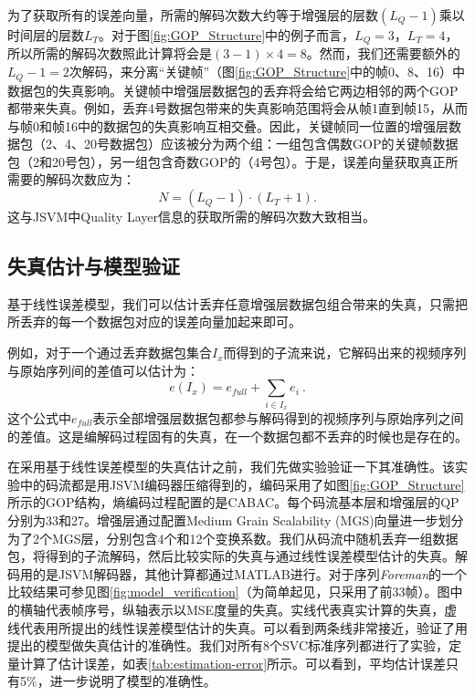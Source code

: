 为了获取所有的误差向量，所需的解码次数大约等于增强层的层数$(L_Q - 1)$乘以时间层的层数$L_T$。对于图\ref{fig:GOP_Structure}中的例子而言，$L_Q = 3$，$L_T = 4$，所以所需的解码次数照此计算将会是$(3 - 1) \times 4 = 8$。然而，我们还需要额外的$L_Q - 1 = 2$次解码，来分离“关键帧”\supercite{H.264-Overview}（图\ref{fig:GOP_Structure}中的帧0、8、16）中数据包的失真影响。关键帧中增强层数据包的丢弃将会给它两边相邻的两个GOP都带来失真。例如，丢弃4号数据包带来的失真影响范围将会从帧1直到帧15，从而与帧0和帧16中的数据包的失真影响互相交叠。因此，关键帧同一位置的增强层数据包（2、4、20号数据包）应该被分为两个组：一组包含偶数GOP的关键帧数据包（2和20号包），另一组包含奇数GOP的（4号包）。于是，误差向量获取真正所需要的解码次数应为：
\begin{equation}
N = (L_Q - 1) \cdot (L_T + 1).
\end{equation}
这与JSVM中Quality Layer信息的获取所需的解码次数大致相当。

\subsection{失真估计与模型验证}
\label{subsec:distortion-estimation}

基于线性误差模型，我们可以估计丢弃任意增强层数据包组合带来的失真，只需把所丢弃的每一个数据包对应的误差向量加起来即可。

例如，对于一个通过丢弃数据包集合$I_x$而得到的子流来说，它解码出来的视频序列与原始序列间的差值可以估计为：
\begin{equation}
\label{eq:subset_error}
e(I_x) = e_{full} + \sum_{i \in {I_x}} e_i \: .
\end{equation}
这个公式中$e_{full}$表示全部增强层数据包都参与解码得到的视频序列与原始序列之间的差值。这是编解码过程固有的失真，在一个数据包都不丢弃的时候也是存在的。

在采用基于线性误差模型的失真估计之前，我们先做实验验证一下其准确性。该实验中的码流都是用JSVM编码器压缩得到的，编码采用了如图\ref{fig:GOP_Structure}所示的GOP结构，熵编码过程配置的是CABAC。每个码流基本层和增强层的QP分别为33和27。增强层通过配置Medium Grain Scalability (MGS)向量进一步划分为了2个MGS层，分别包含4个和12个变换系数。我们从码流中随机丢弃一组数据包，将得到的子流解码，然后比较实际的失真与通过线性误差模型估计的失真。解码用的是JSVM解码器，其他计算都通过MATLAB进行。对于序列{\em Foreman}的一个比较结果可参见图\ref{fig:model_verification}（为简单起见，只采用了前33帧）。图中的横轴代表帧序号，纵轴表示以MSE度量的失真。实线代表真实计算的失真，虚线代表用所提出的线性误差模型估计的失真。可以看到两条线非常接近，验证了用提出的模型做失真估计的准确性。我们对所有8个SVC标准序列都进行了实验，定量计算了估计误差，如表\ref{tab:estimation-error}所示。可以看到，平均估计误差只有5\%，进一步说明了模型的准确性。

